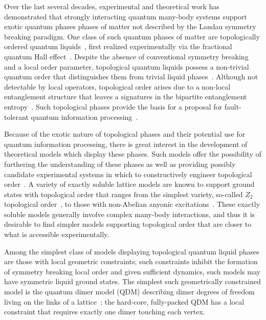 \documentclass[twocolumn,prb,aps,floatfix,superscriptaddress]{revtex4-1}
\begin{document}
Over the last several decades, experimental and theoretical work has demonstrated that strongly interacting quantum many-body systems support exotic quantum phases phases of matter not described by the Landau symmetry breaking paradigm. One class of such quantum phases of matter are topologically ordered quantum liquids~\cite{Wen1990}, first realized experimentally via the fractional quantum Hall effect~\cite{FQHE????}. Despite the absence of conventional symmetry breaking and a local order parameter, topological quantum liquids possess a non-trivial quantum order that distinguishes them from trivial liquid phases~\cite{Nayak2008}. Although not detectable by local operators, topological order arises due to a non-local entanglement structure that leaves a signatures in the bipartite entanglement entropy~\cite{Levin2006a,Kitaev2006b}. Such topological phases provide the basis for a proposal for fault-tolerant quantum information processing~\cite{Freedman2001,Kitaev2003}.

Because of the exotic nature of topological phases and their potential use for quantum information processing, there is great interest in the development of theoretical models which display these phases. Such models offer the possibility of furthering the understanding of these phases as well as providing possibly candidate experimental systems in which to constructively engineer topological order~\cite{Duan2003,Jaksch2005,Lewenstein2007,Jiang2008d,Weimer2010a,Herdman2010c,Martinis2015}. A variety of exactly soluble lattice models are known to support ground states with topological order that ranges from the simplest variety, so-called $Z_2$ topological order~\cite{Kitaev2003,Wen2003}, to those with non-Abelian anyonic excitations~\cite{Levin2005a,Kitaev2006a}. These exactly soluble models generally involve complex many-body interactions, and thus it is desirable to find simpler models supporting topological order that are closer to what is accessible experimentally.

Among the simplest class of models displaying topological quantum liquid phases are those with local geometric constraints; such constraints inhibit the formation of symmetry breaking local order and given sufficient dynamics, such models may have symmetric liquid ground states. The simplest such geometrically constrained model is the quantum dimer model (QDM) describing dimer degrees of freedom living on the links of a lattice~\cite{Rokhsar1988,Moessner2008}; the hard-core, fully-packed QDM has a local constraint that requires exactly one dimer touching each vertex.
\end{document}
